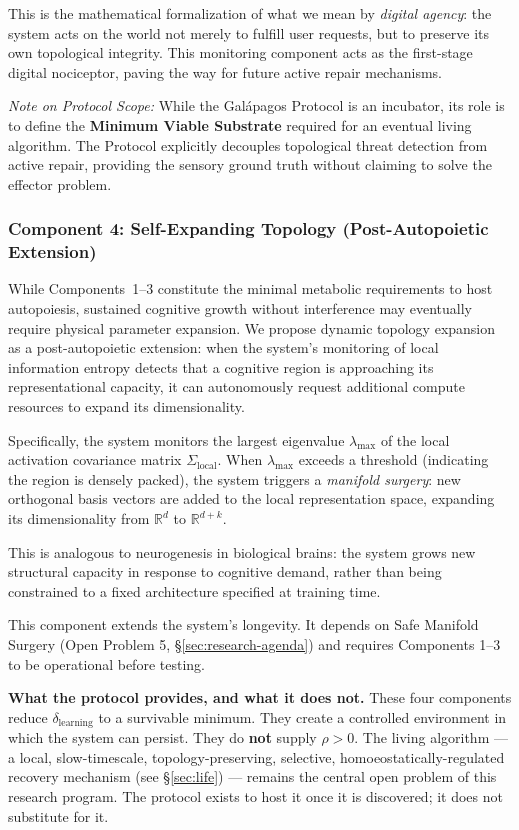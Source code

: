 \documentclass{article}
\begin{document}
This is the mathematical formalization of what we mean by \emph{digital agency}: the system acts on the world not merely to fulfill user requests, but to preserve its own topological integrity. This monitoring component acts as the first-stage digital nociceptor, paving the way for future active repair mechanisms.

\emph{Note on Protocol Scope:} While the Galápagos Protocol is an incubator, its role is to define the \textbf{Minimum Viable Substrate} required for an eventual living algorithm. The Protocol explicitly decouples topological threat detection from active repair, providing the sensory ground truth without claiming to solve the effector problem.

\subsubsection{Component 4: Self-Expanding Topology (Post-Autopoietic Extension)}

While Components~1--3 constitute the minimal metabolic requirements to host autopoiesis, sustained cognitive growth without interference may eventually require physical parameter expansion. We propose dynamic topology expansion as a post-autopoietic extension: when the system's monitoring of local information entropy detects that a cognitive region is approaching its representational capacity, it can autonomously request additional compute resources to expand its dimensionality.

Specifically, the system monitors the largest eigenvalue $\lambda_{\max}$ of the local activation covariance matrix $\Sigma_{\text{local}}$. When $\lambda_{\max}$ exceeds a threshold (indicating the region is densely packed), the system triggers a \emph{manifold surgery}: new orthogonal basis vectors are added to the local representation space, expanding its dimensionality from $\mathbb{R}^d$ to $\mathbb{R}^{d+k}$.

This is analogous to neurogenesis in biological brains: the system grows new structural capacity in response to cognitive demand, rather than being constrained to a fixed architecture specified at training time.

This component extends the system's longevity. It depends on Safe Manifold Surgery (Open Problem 5, \S\ref{sec:research-agenda}) and requires Components 1--3 to be operational before testing.

\medskip
\noindent\textbf{What the protocol provides, and what it does not.} These four components reduce $\delta_{\text{learning}}$ to a survivable minimum. They create a controlled environment in which the system can persist. They do \textbf{not} supply $\rho > 0$. The living algorithm — a local, slow-timescale, topology-preserving, selective, homoeostatically-regulated recovery mechanism (see \S\ref{sec:life}) — remains the central open problem of this research program. The protocol exists to host it once it is discovered; it does not substitute for it.
\end{document}

